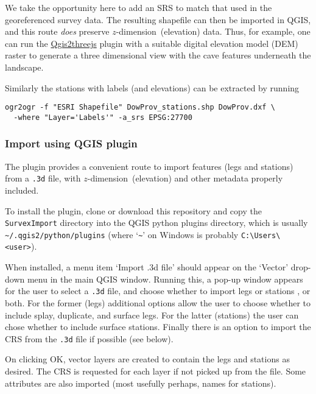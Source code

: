 \documentclass[]{article}
\newcommand{\zdimension}{$z$-dimension}
\begin{document}
We take the opportunity here to add an SRS to match that used in the
georeferenced survey data. The resulting shapefile can then be imported
in QGIS, and this route \emph{does} preserve \zdimension\ (elevation)
data. Thus, for example, one can run the
\href{https://plugins.qgis.org/plugins/Qgis2threejs/}{Qgis2threejs}
plugin with a suitable digital elevation model (DEM) raster to generate
a three dimensional view with the cave features underneath the
landscape.

Similarly the stations with labels (and elevations) can be extracted by
running

\begin{verbatim}
ogr2ogr -f "ESRI Shapefile" DowProv_stations.shp DowProv.dxf \
  -where "Layer='Labels'" -a_srs EPSG:27700
\end{verbatim}

\subsubsection{Import using QGIS plugin}\label{import-using-qgis-plugin}

The plugin provides a convenient route to import features (legs and
stations) from a \verb}.3d} file, with \zdimension\ (elevation) and
other metadata properly included.

To install the plugin, clone or download this repository and copy the
\verb}SurvexImport} directory into the QGIS python plugins directory,
which is usually \verb}~/.qgis2/python/plugins} (where
`\verb}~}' on Windows is probably
\verb}C:\Users\<user>}).

When installed, a menu item `Import .3d file' should appear on the
`Vector' drop-down menu in the main QGIS window. Running this, a pop-up
window appears for the user to select a \verb}.3d} file, and choose
whether to import legs or stations , or both. For the former (legs)
additional options allow the user to choose whether to include splay,
duplicate, and surface legs. For the latter (stations) the user can
chose whether to include surface stations. Finally there is an option to
import the CRS from the \verb}.3d} file if possible (see below).

On clicking OK, vector layers are created to contain the legs and
stations as desired. The CRS is requested for each layer if not picked
up from the file. Some attributes are also imported (most usefully
perhaps, names for stations).
\end{document}
